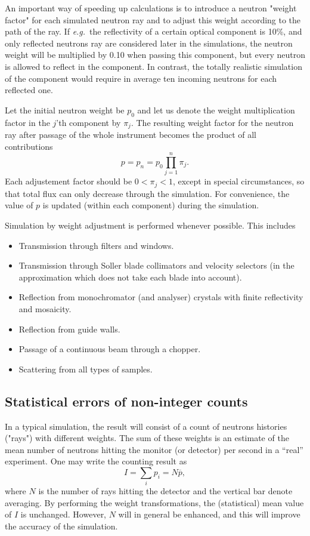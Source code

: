 An important way of speeding up calculations is to introduce
a neutron "weight factor" for each simulated neutron ray and to
adjust this weight according to the path of the ray.
If {\em e.g.}\ the reflectivity of a certain
optical component is 10\%, and only reflected neutrons ray are
considered later in the simulations, the neutron
weight will be multiplied by 0.10 when passing this component,
but every neutron is allowed to reflect in the component.
In contrast, the totally realistic simulation of the component
would require in average ten incoming neutrons for each reflected one.

Let the initial neutron weight be $p_0$ and let us denote the weight
multiplication factor in the $j$'th component by $\pi_j$.  The resulting
weight factor for the neutron ray after passage of the whole instrument
becomes the product of all contributions
\begin{equation}
\label{e:probprod}
p = p_n = p_0 \prod_{j=1}^n \pi_j .
\end{equation}
Each adjustement factor should be $0 < \pi_j < 1$, except in special circumstances, so that total flux can only decrease through the simulation. For convenience, the value of $p$ is updated (within each component)
during the simulation.

Simulation by weight adjustment is performed
whenever possible. This includes
\begin{itemize}
\item Transmission through filters and windows.
\item Transmission through Soller blade collimators and velocity
  selectors
 (in the approximation
 which does not take each blade into account).
\item Reflection from monochromator (and analyser) crystals
 with finite reflectivity and mosaicity.
\item Reflection from guide walls.
\item Passage of a continuous beam through a chopper.
\item Scattering from all types of samples.
\end{itemize}

\subsection{Statistical errors of non-integer counts}
\label{s:staterror}

In a typical simulation, the result will consist of a
count of neutrons histories ("rays") with different weights. The
sum of these weights is an estimate of the mean number of neutrons
hitting the monitor (or detector) per second in a ``real'' experiment.
One may write the counting result as
\begin{equation}
\label{psum}
I = \sum_i p_i = N \overline{p} ,
\end{equation}
where $N$ is the number of rays hitting the detector and the vertical bar
denote averaging.
By performing the weight transformations, the (statistical)
mean value of $I$ is unchanged. However, $N$ will in general be enhanced,
and this will improve the accuracy of the simulation.

